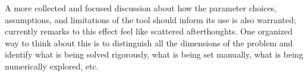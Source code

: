 \documentclass[11pt]{article}
\begin{document}
\begin{itemize}
\begin{itshape}
            A more collected and focused discussion about how the parameter choices, assumptions, and limitations of the tool should inform its use is also warranted; currently remarks to this effect feel like scattered afterthoughts.  One organized way to think about this is to distinguish all the dimensions of the problem and identify what is being solved rigorously, what is being set manually, what is being numerically explored, etc.
        \end{itshape}
\end{itemize}
% 
% 
\end{document}
